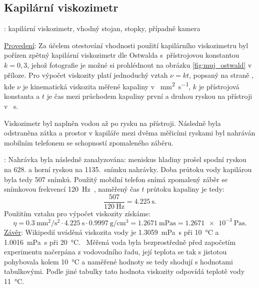 \documentclass[12pt]{article}
\begin{document}
\subsection{Kapilární viskozimetr}
\noindent \underline{}: kapilární viskozimetr, vhodný stojan, stopky, případně kamera
\par
\noindent \underline{Provedení}: Za účelem otestování vhodnosti použití kapilárního viskozimetru byl pořízen zpětný kapilární viskozimetr dle Ostwalda s~přístrojovou konstantou $k = 0,3$, jehož fotografie je možné si prohlédnout na obrázku \ref{fig:muj_ostwald} v příloze.  Pro výpočet viskozity platí jednoduchý vztah $\nu=kt$, popsaný na straně \pageref{eq:kapilarni_viskozimetr}, kde $\nu$ je kinematická viskozita měřené kapaliny v \SI{}{\milli\metre\squared\per\second}, $k$ je přístrojová konstanta a $t$ je čas mezi průchodem kapaliny první a druhou ryskou na přístroji v \SI{}{\second}.
\par
Viskozimetr byl naplněn vodou až po rysku na přístroji. Následně byla odstraněna zátka a prostor v kapiláře mezi dvěma měřicími ryskami byl nahráván mobilním telefonem se schopností zpomaleného záběru.
\par
\underline{}: Nahrávka byla následně zanalyzována: meniskus hladiny prošel spodní ryskou na 628. a horní ryskou na 1135.~snímku nahrávky. Doba průtoku vody kapilárou byla tedy 507 snímků. Použitý mobilní telefon snímá zpomalený záběr se snímkovou frekvencí \SI{120}{\hertz}\footnotemark~\cite{rec:Samsung_A40}, naměřený čas $t$ průtoku kapaliny je tedy:
\begin{equation}
    \frac{507}{\SI{120}{\hertz}} = \SI{4,225}{\second}\text{.}
\end{equation}
Použitím vztahu pro výpočet viskozity získáme:~\cite{online:Water_density}
\begin{equation}
    \eta = \SI{0,3}{\milli\metre\squared\per\second\squared}\cdot\SI{4,225}{\second}\cdot\SI{0.9997}{\gram\per\centi\meter\cubed} = \SI{1,2671}{\milli\pascal\second} = \SI{1,2671e-3}{\pascal\second}\text{.}
\end{equation}
\noindent
\underline{Závěr}: Wikipedií uváděná viskozita vody je \SI{1,3059}{\milli\pascal\second} při \SI{10}{\degreeCelsius} a \SI{1,0016}{\milli\pascal\second} při \SI{20}{\degreeCelsius}.~\cite{wiki:Viscosity} Měřená voda byla bezprostředně před započetím experimentu načerpána z vodovodního řadu, její teplota se tak s jistotou pohybovala kolem \SI{10}{\degreeCelsius} a naměřené hodnoty se tedy shodují s hodnotami tabulkovými. Podle jiné tabulky tato hodnota viskozity odpovídá teplotě vody \SI{11}{\degreeCelsius}.~\cite{online:Water_viscosity}
\end{document}
